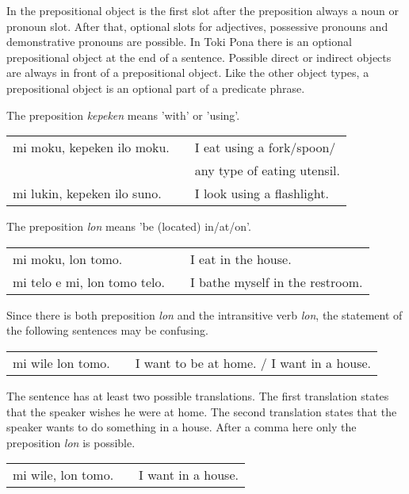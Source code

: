 In the prepositional object is the first slot after the preposition always a noun or pronoun slot.
After that, optional slots for adjectives, possessive pronouns and demonstrative pronouns are possible.
In Toki Pona there is an optional prepositional object at the end of a sentence.
Possible direct or indirect objects are always in front of a prepositional object.
Like the other object types, a prepositional object is an optional part of a predicate phrase.

The preposition \textit{kepeken} means 'with' or 'using'.

\begin{supertabular}{p{5,5cm}|ll}
    mi moku, kepeken ilo moku.  &  & I eat using a fork/spoon/  \\ && any type of eating utensil. \\
    mi lukin, kepeken ilo suno. &  & I look using a flashlight. \\
\end{supertabular}

The preposition \textit{lon} means 'be (located) in/at/on'.

\begin{supertabular}{p{5,5cm}|ll}
    mi moku, lon tomo.           &  & I eat in the house.             \\
    mi telo e mi, lon tomo telo. &  & I bathe myself in the restroom. \\
\end{supertabular}

Since there is both preposition \textit{lon} and the intransitive verb \textit{lon}, the statement of the following sentences may be confusing.

\begin{supertabular}{p{5,5cm}|ll}
    mi wile lon tomo. &  & I want to be at home. / I want in a house. \\
\end{supertabular}

The sentence has at least two possible translations.
The first translation states that the speaker wishes he were at home.
The second translation states that the speaker wants to do something in a house.
After a comma here only the preposition \textit{lon} is possible.

\begin{supertabular}{p{5,5cm}|ll}
    mi wile, lon tomo. &  & I want in a house. \\
\end{supertabular}


